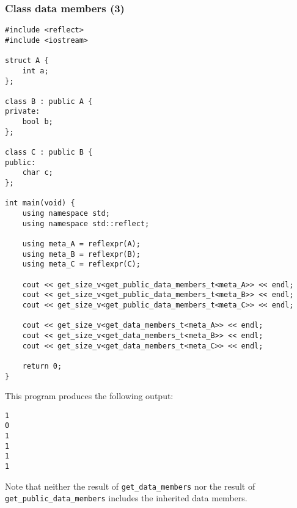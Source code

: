 \subsubsection{Class data members (3)}

\begin{verbatim}
#include <reflect>
#include <iostream>

struct A {
	int a;
};

class B : public A {
private:
	bool b;
};

class C : public B {
public:
	char c;
};

int main(void) {
	using namespace std;
	using namespace std::reflect;

	using meta_A = reflexpr(A);
	using meta_B = reflexpr(B);
	using meta_C = reflexpr(C);

	cout << get_size_v<get_public_data_members_t<meta_A>> << endl;
	cout << get_size_v<get_public_data_members_t<meta_B>> << endl;
	cout << get_size_v<get_public_data_members_t<meta_C>> << endl;

	cout << get_size_v<get_data_members_t<meta_A>> << endl;
	cout << get_size_v<get_data_members_t<meta_B>> << endl;
	cout << get_size_v<get_data_members_t<meta_C>> << endl;

	return 0;
}
\end{verbatim}

This program produces the following output:

\begin{verbatim}
1
0
1
1
1
1
\end{verbatim}

Note that neither the result of \texttt{get\_data\_members} nor the result of
\texttt{get\_public\_data\_members} includes the inherited data members.
